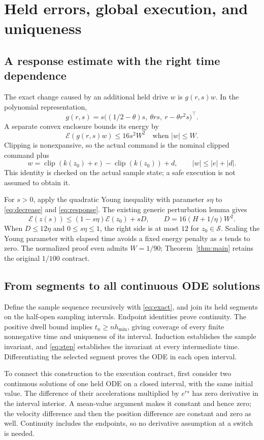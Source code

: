 \documentclass[10pt]{article}
\newcommand{\E}{\mathcal E}
\newcommand{\clip}{\operatorname{clip}}
\begin{document}
\section{Held errors, global execution, and uniqueness}
\subsection{A response estimate with the right time dependence}
The exact change caused by an additional held drive $w$ is $g(r,s)w$. In the polynomial representation,
\[
 g(r,s)=s\bigl((1/2-\theta)s,\ \theta rs,\ r-\theta r^2s\bigr)^\top.
\]
A separate convex enclosure bounds its energy by
\begin{equation}\label{eq:response}
 \E(g(r,s)w)\le16s^2W^2 \quad\text{when } |w|\le W.
\end{equation}
Clipping is nonexpansive, so the actual command is the nominal clipped command plus
\[
 w=\clip(k(z_0)+e)-\clip(k(z_0))+d,\qquad |w|\le|e|+|d|.
\]
This identity is checked on the actual sample state; a safe execution is not assumed to obtain it.

For $s>0$, apply the quadratic Young inequality with parameter $s\eta$ to \eqref{eq:decrease} and \eqref{eq:response}. The existing generic perturbation lemma gives
\begin{equation}\label{eq:step}
 \E(z(s))\le(1-s\eta)\E(z_0)+sD,\qquad
 D=16(H+1/\eta)W^2.
\end{equation}
When $D\le12\eta$ and $0\le s\eta\le1$, the right side is at most $12$ for $z_0\in\mathcal S$. Scaling the Young parameter with elapsed time avoids a fixed energy penalty as $s$ tends to zero. The normalized proof even admits $W=1/90$; Theorem~\ref{thm:main} retains the original $1/100$ contract.

\subsection{From segments to all continuous ODE solutions}
Define the sample sequence recursively with \eqref{eq:exact}, and join its held segments on the half-open sampling intervals. Endpoint identities prove continuity. The positive dwell bound implies $t_n\ge nh_{\min}$, giving coverage of every finite nonnegative time and uniqueness of its interval. Induction establishes the sample invariant, and \eqref{eq:step} establishes the invariant at every intermediate time. Differentiating the selected segment proves the ODE in each open interval.

To connect this construction to the execution contract, first consider two continuous solutions of one held ODE on a closed interval, with the same initial value. The difference of their accelerations multiplied by $e^{rs}$ has zero derivative in the interval interior. A mean-value argument makes it constant and hence zero; the velocity difference and then the position difference are constant and zero as well. Continuity includes the endpoints, so no derivative assumption at a switch is needed.
\end{document}
